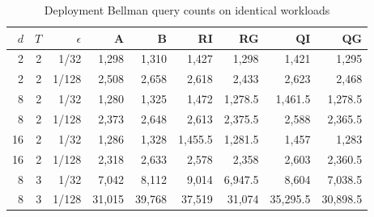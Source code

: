 \begin{table}[htbp]
\centering\caption{Deployment Bellman query counts on identical workloads}\label{tab:queries65}
{\small\setlength{\tabcolsep}{4pt}
\begin{tabular}{rrrrrrrrr}
\toprule
$d$ & $T$ & $\epsilon$ & A & B & RI & RG & QI & QG \\
\midrule
2 & 2 & 1/32 & 1,298 & 1,310 & 1,427 & 1,298 & 1,421 & 1,295 \\
2 & 2 & 1/128 & 2,508 & 2,658 & 2,618 & 2,433 & 2,623 & 2,468 \\
8 & 2 & 1/32 & 1,280 & 1,325 & 1,472 & 1,278.5 & 1,461.5 & 1,278.5 \\
8 & 2 & 1/128 & 2,373 & 2,648 & 2,613 & 2,375.5 & 2,588 & 2,365.5 \\
16 & 2 & 1/32 & 1,286 & 1,328 & 1,455.5 & 1,281.5 & 1,457 & 1,283 \\
16 & 2 & 1/128 & 2,318 & 2,633 & 2,578 & 2,358 & 2,603 & 2,360.5 \\
8 & 3 & 1/32 & 7,042 & 8,112 & 9,014 & 6,947.5 & 8,604 & 7,038.5 \\
8 & 3 & 1/128 & 31,015 & 39,768 & 37,519 & 31,074 & 35,295.5 & 30,898.5 \\
\bottomrule
\end{tabular}}
\par{}
\end{table}
